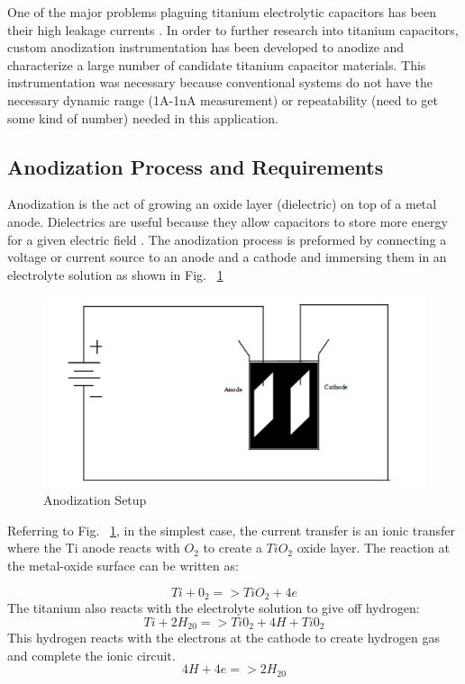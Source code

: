\documentclass[journal]{IEEEtran}
\begin{document}
One of the major problems plaguing titanium electrolytic capacitors has been their high leakage currents \cite{tiCharHag}. In order to further research into titanium capacitors, custom anodization instrumentation has been developed to anodize and characterize a large number of candidate titanium capacitor materials. This instrumentation was necessary because conventional systems do not have the necessary dynamic range (1A-1nA measurement) or repeatability (need to get some kind of number) needed in this application.


\subsection{Anodization Process and Requirements}

Anodization is the act of growing an oxide layer (dielectric) on top of a metal anode. Dielectrics are useful because they allow capacitors to store more energy for a given electric field \cite{cwruEncDie}. The anodization process is preformed by connecting a voltage or current source to an anode and a cathode and immersing them in an electrolyte solution as shown in Fig. ~\ref{fig:anodSetup}

\begin{figure}[here]
\centering
\includegraphics{anodSetup}
\caption{Anodization Setup}
\label{fig:anodSetup}
\end{figure}


Referring to Fig. ~\ref{fig:anodSetup}, in the simplest case, the current transfer is an ionic transfer where the Ti anode reacts with $O_{2}$ to create a $TiO_{2}$ oxide layer. The reaction at the metal-oxide surface can be written as:

\begin{equation}
Ti + 0_2 => TiO_2 + 4e
\end{equation}
The titanium also reacts with the electrolyte solution to give off hydrogen:
\begin{equation}
Ti + 2H_20 => Ti0_2 + 4H+Ti0_2
\end{equation}
This hydrogen reacts with the electrons at the cathode to create hydrogen gas and complete the ionic circuit.
\begin{equation}
4H + 4e => 2H_20
\end{equation}
\end{document}
